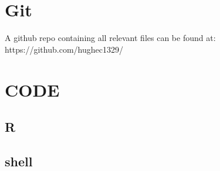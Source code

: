 \documentclass[12pt]{article}
\begin{document}
	\section{Git}
		 A github repo containing all relevant files can be found at: https://github.com/hughec1329/

\newpage
	\section{CODE}
	\subsection{R}
		
	\newpage
	\subsection{shell}
		
		
		
\end{document}
